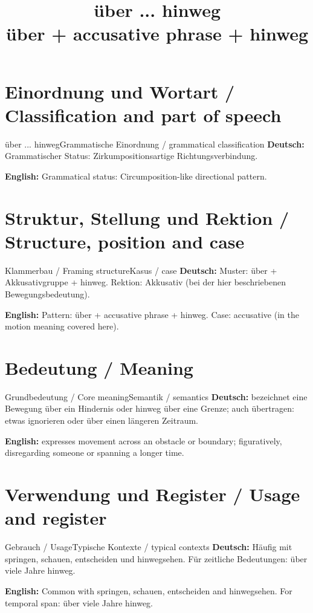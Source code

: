 \documentclass[a4paper,11pt]{article}
\title{über ... hinweg\\ \large über + accusative phrase + hinweg}
\date{}
\newcommand{\GermanText}[1]{\textbf{Deutsch: }#1\par}
\newcommand{\EnglishText}[1]{{\small\color{SoftGray}\textbf{English: }#1\par}}
\begin{document}
\maketitle
\tableofcontents
\newpage
\section{Einordnung und Wortart / Classification and part of speech}
\begin{grammarentry}{über ... hinweg}{Grammatische Einordnung / grammatical classification}
\GermanText{Grammatischer Status: Zirkumpositionsartige Richtungsverbindung.}
\EnglishText{Grammatical status: Circumposition-like directional pattern.}
\end{grammarentry}
\section{Struktur, Stellung und Rektion / Structure, position and case}
\begin{grammarentry}{Klammerbau / Framing structure}{Kasus / case}
\GermanText{Muster: über + Akkusativgruppe + hinweg. Rektion: Akkusativ (bei der hier beschriebenen Bewegungsbedeutung).}
\EnglishText{Pattern: über + accusative phrase + hinweg. Case: accusative (in the motion meaning covered here).}
\end{grammarentry}
\section{Bedeutung / Meaning}
\begin{grammarentry}{Grundbedeutung / Core meaning}{Semantik / semantics}
\GermanText{bezeichnet eine Bewegung über ein Hindernis oder hinweg über eine Grenze; auch übertragen: etwas ignorieren oder über einen längeren Zeitraum.}
\EnglishText{expresses movement across an obstacle or boundary; figuratively, disregarding someone or spanning a longer time.}
\end{grammarentry}
\section{Verwendung und Register / Usage and register}
\begin{grammarentry}{Gebrauch / Usage}{Typische Kontexte / typical contexts}
\GermanText{Häufig mit springen, schauen, entscheiden und hinwegsehen. Für zeitliche Bedeutungen: über viele Jahre hinweg.}
\EnglishText{Common with springen, schauen, entscheiden and hinwegsehen. For temporal span: über viele Jahre hinweg.}
\end{grammarentry}
\end{document}
